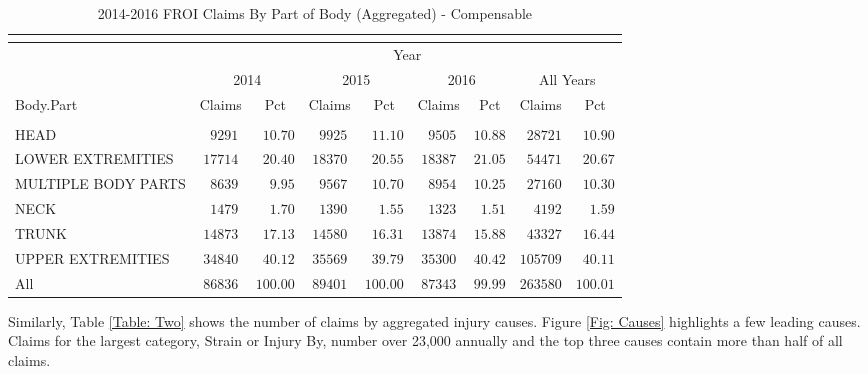 \documentclass[9pt, oneside]{article}   	%
\begin{document}
\begin{longtable}{lcccccccc}
\caption{2014-2016 FROI Claims By Part of Body (Aggregated) - Compensable}\\
 \label{Table: One}\\
  \hline

                  \toprule
 & \multicolumn{8}{c}{Year} \\ 
 & \multicolumn{2}{c}{2014} & \multicolumn{2}{c}{2015} & \multicolumn{2}{c}{2016} & \multicolumn{2}{c}{All Years} \\ 
Body.Part  & Claims & Pct & Claims & Pct & Claims & Pct & Claims & \multicolumn{1}{c}{Pct} \\ 
\midrule\\ [-1\normalbaselineskip]\hline\endhead\hline\endfoot
HEAD  & $\phantom{0}9291$ & $\phantom{0}10.70$ & $\phantom{0}9925$ & $\phantom{0}11.10$ & $\phantom{0}9505$ & $10.88$ & $\phantom{0}28721$ & $\phantom{0}10.90$ \\
LOWER EXTREMITIES  & $17714$ & $\phantom{0}20.40$ & $18370$ & $\phantom{0}20.55$ & $18387$ & $21.05$ & $\phantom{0}54471$ & $\phantom{0}20.67$ \\
MULTIPLE BODY PARTS  & $\phantom{0}8639$ & $\phantom{00}9.95$ & $\phantom{0}9567$ & $\phantom{0}10.70$ & $\phantom{0}8954$ & $10.25$ & $\phantom{0}27160$ & $\phantom{0}10.30$ \\
NECK  & $\phantom{0}1479$ & $\phantom{00}1.70$ & $\phantom{0}1390$ & $\phantom{00}1.55$ & $\phantom{0}1323$ & $\phantom{0}1.51$ & $\phantom{00}4192$ & $\phantom{00}1.59$ \\
TRUNK  & $14873$ & $\phantom{0}17.13$ & $14580$ & $\phantom{0}16.31$ & $13874$ & $15.88$ & $\phantom{0}43327$ & $\phantom{0}16.44$ \\
UPPER EXTREMITIES  & $34840$ & $\phantom{0}40.12$ & $35569$ & $\phantom{0}39.79$ & $35300$ & $40.42$ & $105709$ & $\phantom{0}40.11$ \\
\cline{1-1} \cline{2-2} \cline{3-3} \cline{4-4} \cline{5-5} \cline{6-6} \cline{7-7} \cline{8-8} \cline{9-9} %
All  & $86836$ & $100.00$ & $89401$ & $100.00$ & $87343$ & $99.99$ & $263580$ & $100.01$ \\
\hline 
\end{longtable}



\pagebreak

Similarly, Table \ref{Table: Two} shows the number of claims by aggregated injury causes. Figure \ref{Fig: Causes} highlights a few leading causes. Claims for the largest category, Strain or Injury By, number over 23,000 annually and the top three causes contain more than half of all claims.
\end{document}
